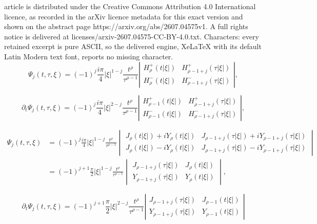 \documentclass[10pt,a4paper]{amsart}
\begin{document}
article is distributed under the Creative Commons Attribution 4.0 International licence, as recorded in the arXiv licence metadata for this exact version and shown on the abstract page https://arxiv.org/abs/2607.04575v1. A full rights notice is delivered at licenses/arxiv-2607.04575-CC-BY-4.0.txt. Characters: every retained excerpt is pure ASCII, so the delivered engine, XeLaTeX with its default Latin Modern text font, reports no missing character.
\begin{equation}\label{equ:q6}
\Psi_{j}(t, \tau, \xi)=(-1)^{j}\frac{i \pi}{4}|\xi|^{1-j}  \frac{t^{\rho}}{\tau^{\rho-1}}\left|\begin{array}{ll}
H_{\rho}^{+}(t|\xi|) & H_{\rho-1+j}^{+}(\tau|\xi|) \\
H_{\rho}^{-}(t|\xi|) & H_{\rho-1+j}^{-}(\tau|\xi|)
\end{array}\right|,
\end{equation}

\begin{equation}\label{equ:q9}
\partial_{t} \Psi_{j}(t, \tau, \xi)=(-1)^{j} \frac{i \pi}{4}|\xi|^{2-j} \frac{t^{\rho}}{\tau^{\rho-1}}\left|\begin{array}{ll}
H_{\rho-1}^{+}(t|\xi|) & H_{\rho-1+j}^{+}(\tau|\xi|)  \\
H_{\rho-1}^{-}(t|\xi|) & H_{\rho-1+j}^{-}(\tau|\xi|)
\end{array}\right|,
\end{equation}

\begin{equation}\label{equ:q9-3}
\begin{aligned}
\Psi_j(t,\tau,\xi)
&= (-1)^{j}\frac{i \pi}{4}|\xi|^{1-j}  \frac{t^{\rho}}{\tau^{\rho-1}}
\begin{vmatrix}
J_{\rho}(t|\xi|) + iY_{\rho}(t|\xi|) & J_{\rho-1+j}(\tau|\xi|) + iY_{\rho-1+j}(\tau|\xi|) \\
J_{\rho}(t|\xi|) - iY_{\rho}(t|\xi|) & J_{\rho-1+j}(\tau|\xi|) - iY_{\rho-1+j}(\tau|\xi|)
\end{vmatrix} \\
&= (-1)^{j+1}\frac{\pi}{2}|\xi|^{1-j}  \frac{t^{\rho}}{\tau^{\rho-1}}
\begin{vmatrix}
J_{\rho-1+j}(\tau|\xi|) & J_{\rho}(t|\xi|) \\
Y_{\rho-1+j}(\tau|\xi|) & Y_{\rho}(t|\xi|)
\end{vmatrix},
\end{aligned}
\end{equation}

\begin{equation}\label{equ:q9-4}
\partial_{t} \Psi_{j}(t, \tau, \xi)=(-1)^{j+1} \frac{\pi}{2}|\xi|^{2-j} \frac{t^{\rho}}{\tau^{\rho-1}}\left|\begin{array}{ll}
J_{\rho-1+j}(\tau|\xi|) & J_{\rho-1}(t|\xi|)  \\
Y_{\rho-1+j}(\tau|\xi|) & Y_{\rho-1}(t|\xi|)
\end{array}\right|
\end{equation}
\end{document}

